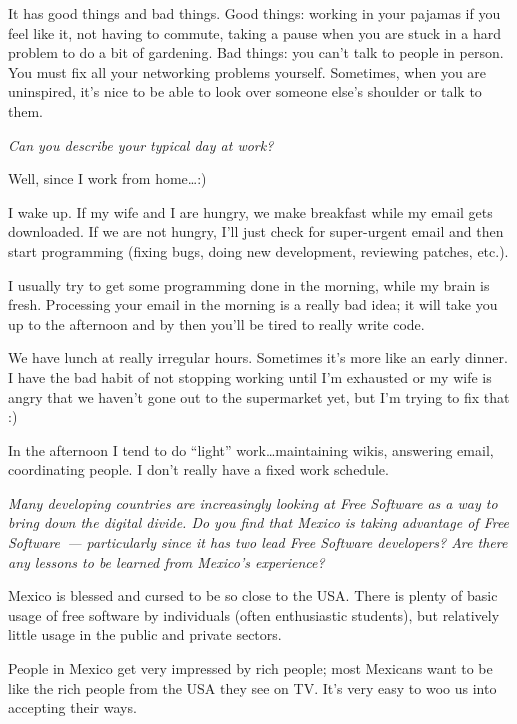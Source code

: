 \documentclass{book}
\begin{document}
It has good things and bad things. Good things: working in your
pajamas if you feel like it, not having to commute, taking a pause
when you are stuck in a hard problem to do a bit of gardening. Bad
things: you can't talk to people in person. You must fix all your
networking problems yourself. Sometimes, when you are uninspired, it's
nice to be able to look over someone else's shoulder or talk to them.

\bigskip

\emph{Can you describe your typical day at work?}

\bigskip

Well, since I work from home\ldots :)

I wake up. If my wife and I are hungry, we make breakfast while my
email gets downloaded. If we are not hungry, I'll just check for
super-urgent email and then start programming (fixing bugs, doing new
development, reviewing patches, etc.).

I usually try to get some programming done in the morning, while my
brain is fresh. Processing your email in the morning is a really bad
idea; it will take you up to the afternoon and by then you'll be tired
to really write code.

We have lunch at really irregular hours. Sometimes it's more like an
early dinner. I have the bad habit of not stopping working until I'm
exhausted or my wife is angry that we haven't gone out to the
supermarket yet, but I'm trying to fix that :)

In the afternoon I tend to do ``light'' work\ldots maintaining wikis,
answering email, coordinating people. I don't really have a fixed work
schedule.

\bigskip

\emph{Many developing countries are increasingly looking at Free
  Software as a way to bring down the digital divide. Do you find that
  Mexico is taking advantage of Free Software~--- particularly since it
  has two lead Free Software developers? Are there any lessons to be
  learned from Mexico's experience?}

\bigskip

Mexico is blessed and cursed to be so close to the USA. There is
plenty of basic usage of free software by individuals (often
enthusiastic students), but relatively little usage in the public and
private sectors.

People in Mexico get very impressed by rich people; most Mexicans want
to be like the rich people from the USA they see on TV. It's very easy
to woo us into accepting their ways.
\end{document}
